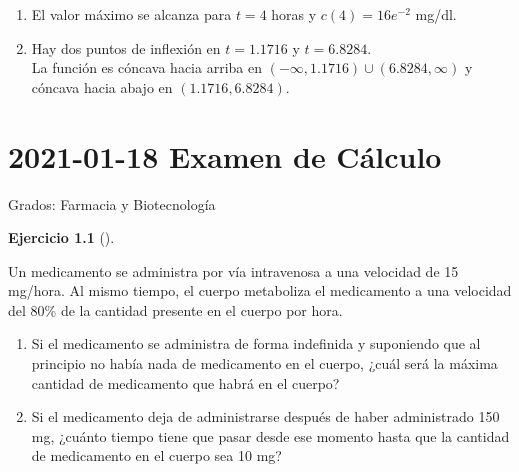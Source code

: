 \documentclass[
  a4paper,
]{scrreport}
\providecommand{\tightlist}{%
  \setlength{\itemsep}{0pt}\setlength{\parskip}{0pt}}\usepackage{longtable,booktabs,array}
\theoremstyle{definition}
\newtheorem{exercise}{Ejercicio}[chapter]
\theoremstyle{remark}
\begin{document}
\begin{tcolorbox}[enhanced jigsaw, opacitybacktitle=0.6, titlerule=0mm, bottomtitle=1mm, toptitle=1mm, breakable, bottomrule=.15mm, left=2mm, opacityback=0, toprule=.15mm, leftrule=.75mm, colframe=quarto-callout-tip-color-frame, coltitle=black, rightrule=.15mm, colback=white, title=\textcolor{quarto-callout-tip-color}{\faLightbulb}\hspace{0.5em}{Solución}, arc=.35mm, colbacktitle=quarto-callout-tip-color!10!white]

\begin{enumerate}
\def\labelenumi{\arabic{enumi}.}
\tightlist
\item
  El valor máximo se alcanza para \(t=4\) horas y \(c(4)=16e^{-2}\)
  mg/dl.
\item
  Hay dos puntos de inflexión en \(t=1.1716\) y \(t=6.8284\).\\
  La función es cóncava hacia arriba en
  \((-\infty, 1.1716) \cup (6.8284, \infty)\) y cóncava hacia abajo en
  \((1.1716, 6.8284)\).
\end{enumerate}

\end{tcolorbox}


\chapter{\texorpdfstring{2021-01-18 Examen de
Cálculo}{2021-01-18  Examen de Cálculo}}\label{examen-de-cuxe1lculo-6}

Grados: Farmacia y Biotecnología

\begin{exercise}[]\protect\hypertarget{exr-1}{}\label{exr-1}

Un medicamento se administra por vía intravenosa a una velocidad de 15
mg/hora. Al mismo tiempo, el cuerpo metaboliza el medicamento a una
velocidad del 80\% de la cantidad presente en el cuerpo por hora.

\begin{enumerate}
\def\labelenumi{\arabic{enumi}.}
\item
  Si el medicamento se administra de forma indefinida y suponiendo que
  al principio no había nada de medicamento en el cuerpo, ¿cuál será la
  máxima cantidad de medicamento que habrá en el cuerpo?
\item
  Si el medicamento deja de administrarse después de haber administrado
  150 mg, ¿cuánto tiempo tiene que pasar desde ese momento hasta que la
  cantidad de medicamento en el cuerpo sea 10 mg?
\end{enumerate}

\end{exercise}
\end{document}
